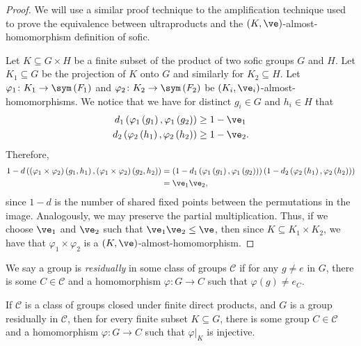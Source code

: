 \documentclass[10pt]{mypackage}
\begin{document}
\begin{proof}
  We will use a similar proof technique to the amplification technique used to prove the equivalence between ultraproducts and the $\left( K,\ve \right)$-almost-homomorphism definition of sofic.

  Let $K\subseteq G\times H$ be a finite subset of the product of two sofic groups $G$ and $H$. Let $K_1\subseteq G$ be the projection of $K$ onto $G$ and similarly for $K_2\subseteq H$. Let $\varphi_1\colon K_1\to \sym\left( F_1 \right)$ and $\varphi_2\colon K_2\to \sym\left( F_2 \right)$ be $\left( K_i,\ve_i \right)$-almost-homomorphisms. We notice that we have for distinct $g_i\in G$ and $h_i\in H$ that
  \begin{align*}
    d_1\left( \varphi_1\left(g_1\right),\varphi_1\left( g_2 \right) \right) &\geq 1-\ve_1\\
    d_2\left( \varphi_2\left( h_1 \right),\varphi_2\left( h_2 \right) \right) &\geq 1-\ve_2.
  \end{align*}
  Therefore,
  \begin{align*}
    1-d\left( \left( \varphi_1\times \varphi_2 \right)\left( g_1,h_1 \right),\left( \varphi_1\times \varphi_2 \right)\left( g_2,h_2 \right) \right) &= \left( 1-d_1\left( \varphi_1\left(g_1\right),\varphi_1\left( g_2 \right) \right) \right)\left( 1-d_2\left( \varphi_2\left( h_1 \right),\varphi_2\left( h_2 \right) \right) \right)\\
                                                                         &= \ve_1\ve_2,
  \end{align*}
  since $1-d$ is the number of shared fixed points between the permutations in the image. Analogously, we may preserve the partial multiplication. Thus, if we choose $\ve_1$ and $\ve_2$ such that $\ve_1\ve_2 \leq \ve$, then since $K\subseteq K_1\times K_2$, we have that $\varphi_1\times\varphi_2$ is a $\left( K,\ve \right)$-almost-homomorphism.
\end{proof}
\begin{definition}
  We say a group is \textit{residually} in some class of groups $ \mathcal{C} $ if for any $g\neq e$ in $G$, there is some $C\in \mathcal{C}$ and a homomorphism $\varphi\colon G\to C$ such that $\varphi(g)\neq e_C$.
\end{definition}
\begin{proposition}
  If $\mathcal{C}$ is a class of groups closed under finite direct products, and $G$ is a group residually in $\mathcal{C}$, then for every finite subset $K\subseteq G$, there is some group $C\in \mathcal{C}$ and a homomorphism $\varphi\colon G\to C$ such that $\varphi|_{K}$ is injective.
\end{proposition}
\end{document}
